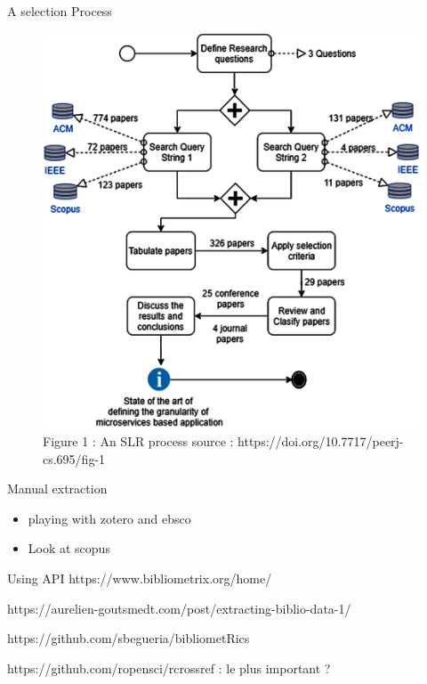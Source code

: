 \documentclass[
  9pt,
  ignorenonframetext,
  aspectratio=54,
]{beamer}
\begin{document}
\begin{frame}{A selection Process}
\protect\hypertarget{a-selection-process}{}
\begin{figure}

{\centering \includegraphics{./images/fig-1-full.png}

}

\caption{Figure 1 : An SLR process source :
https://doi.org/10.7717/peerj-cs.695/fig-1}

\end{figure}
\end{frame}

\begin{frame}{Manual extraction}
\protect\hypertarget{manual-extraction}{}
\begin{itemize}
\item
  playing with zotero and ebsco
\item
  Look at scopus
\end{itemize}
\end{frame}

\begin{frame}{Using API}
\protect\hypertarget{using-api}{}
https://www.bibliometrix.org/home/

https://aurelien-goutsmedt.com/post/extracting-biblio-data-1/

https://github.com/sbegueria/bibliometRics

https://github.com/ropensci/rcrossref : le plus important ?
\end{frame}
\end{document}
